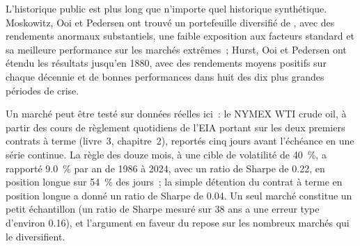 \begin{omfigure}

\label{fig:s1:trend-following:smile}
\end{omfigure}

L'historique public est plus long que n'importe quel historique synthétique. Moskowitz, Ooi et Pedersen ont trouvé un portefeuille diversifié de , avec des
rendements anormaux substantiels, une faible exposition aux facteurs standard et sa meilleure performance sur les marchés extrêmes~; Hurst, Ooi et Pedersen ont étendu les résultats jusqu'en 1880,
avec des rendements moyens positifs sur chaque décennie et de bonnes performances dans huit des dix plus grandes périodes de crise.

Un marché peut être testé sur données réelles ici~: le NYMEX WTI crude oil, à partir des cours de règlement quotidiens de l'EIA portant sur les deux premiers contrats à terme (livre~3, chapitre~2),
reportés cinq jours avant l'échéance en une série continue. La règle des douze mois, à une cible de volatilité de 40~\%, a rapporté 9.0~\% par an de 1986 à 2024, avec
un ratio de Sharpe de 0.22, en position longue sur 54~\% des jours~; la simple détention du contrat à terme en position longue a donné un ratio de Sharpe de 0.04. Un seul marché constitue un petit échantillon (un ratio de Sharpe mesuré
sur 38 ans a une erreur type d'environ 0.16), et l'argument en faveur du  repose sur les nombreux marchés qui le diversifient.

